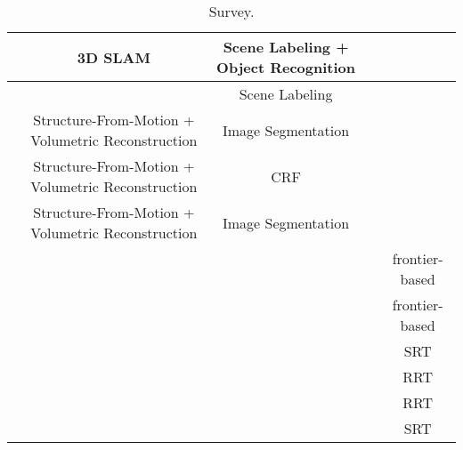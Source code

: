\documentclass[a4paper,landscape]{article}
\begin{document}
\begin{table}[h]
{\begin{tabular}{|l|c|c|c|c|}
			\hline 			 
			\cite{nuchter2008ras} & 3D SLAM & Scene Labeling + Object Recognition &  &   \\ 
			\hline 			 
			\cite{xiong2010bmvc} &  & Scene Labeling &  &   \\ 
			\hline 			 
			\cite{blaha2016cvpr} & Structure-From-Motion + Volumetric Reconstruction & Image Segmentation &  &  \\ 
			\hline 			 
			\cite{kundu2014eccv} & Structure-From-Motion + Volumetric Reconstruction & CRF &  &   \\ 
			\hline 			 
			\cite{hane2013cvpr} & Structure-From-Motion + Volumetric Reconstruction & Image Segmentation &  &   \\ 
			\hline 			 
			\cite{yamauchi1997cira,yamauchi1998frontier,wang2011frontier} &  &  &  &  frontier-based  \\ 
			\hline 			 
			\cite{senarathne2013efficient,keidar2012robot} &  &  &  &  frontier-based  \\ 
			\hline 			 
			\cite{oriolo2004icra,freda2005icra} &  &  &  & SRT \\ 
			\hline 			 
			\cite{lavalle1998rapidly} &  &  &  &  RRT \\ 
			\hline 			
			\cite{bircher2016icra} & & &  &  RRT  \\ 
			\hline 			 
			\cite{el2013improved,franchi2009sensor} &  &  &  &  SRT \\ 
			\hline 			 
		\end{tabular}
		}
		\caption{Survey.}
		\label{tab:survey}
	\end{table}
	
	\clearpage
	
	
	
\end{document}
